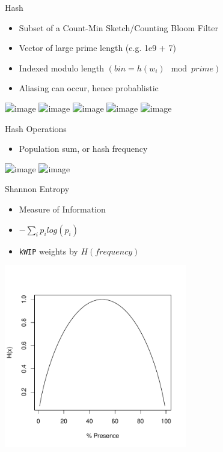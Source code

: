 \documentclass[t]{beamer}
\begin{document}
\begin{frame}{Hash}
  \begin{itemize}
    \item Subset of a Count-Min Sketch/Counting Bloom Filter
    \item Vector of large prime length (e.g. 1e9 + 7)
    \item Indexed modulo length $(bin = h(w_i) \mod prime)$
    \item Aliasing can occur, hence probablistic
  \end{itemize}
  \begin{center}
    \includegraphics<1>[width=0.6\textwidth]{img/hash-0.png}
    \includegraphics<2>[width=0.6\textwidth]{img/hash-1.png}
    \includegraphics<3>[width=0.6\textwidth]{img/hash-2.png}
    \includegraphics<4>[width=0.6\textwidth]{img/hash-3.png}
    \includegraphics<5>[width=0.6\textwidth]{img/hash-4.png}
  \end{center}
\end{frame}


\begin{frame}{Hash Operations}
  \begin{itemize}
    \item Population sum, or hash frequency
  \end{itemize}
  \begin{center}
    \includegraphics<1>[width=0.6\textwidth]{img/hash-sums.png}
    \includegraphics<2>[width=0.6\textwidth]{img/hash-sumfreq.png}
  \end{center}
\end{frame}

\begin{frame}{Shannon Entropy}
  \begin{itemize}
    \item Measure of Information
    \item $ -\sum\limits_{i} p_i log(p_i) $
    \item \texttt{kWIP} weights by $H(frequency)$
  \end{itemize}
  \begin{center}
    \includegraphics[width=0.6\textwidth]{img/shanent.pdf}
  \end{center}
\end{frame}
\end{document}
